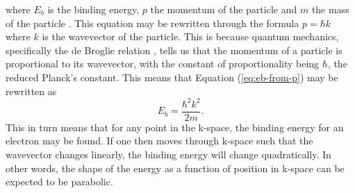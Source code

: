     where $E_b$ is the binding energy, $p$ the momentum of the particle and $m$ the mass of the particle \cite{suto2011energy}. 
    This equation may be rewritten through the formula $p=\hbar k$ where $k$ is the wavevector of the particle. This is because quantum mechanics, 
    specifically the de Broglie relation \cite{guemez2016principle}, tells us that the momentum of a particle is proportional to its wavevector, 
    with the constant of proportionality being $\hbar$, the reduced Planck's constant. This means that Equation (\ref{eq:eb-from-p}) may be rewritten 
    as\begin{equation}
        E_b = \frac{\hbar^2k^2}{2m}.
    \end{equation}
    This in turn means that for any point in the k-space, the binding energy for an electron may be found. If one then moves through k-space such that 
    the wavevector changes linearly, the binding energy will change quadratically. In other words, the shape of the energy as a function of position in 
    k-space can be expected to be parabolic.
    
